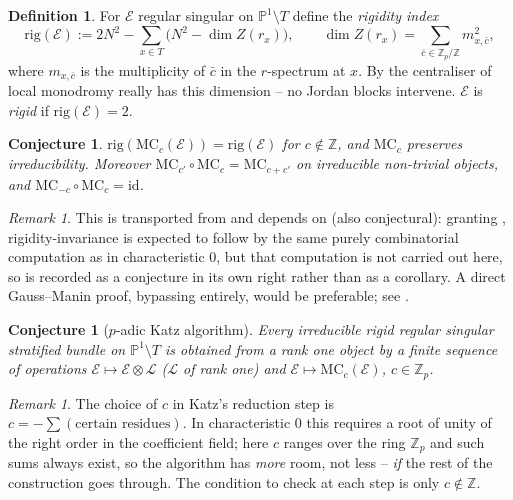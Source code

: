 \documentclass[11pt,reqno]{amsart}
\newcommand{\Zp}{\mathbb{Z}_p}
\newcommand{\ZZ}{\mathbb{Z}}
\newcommand{\PP}{\mathbb{P}}
\newcommand{\cE}{\mathcal{E}}
\newcommand{\cL}{\mathcal{L}}
\newcommand{\id}{\mathrm{id}}
\newcommand{\MC}{\mathrm{MC}}
\newcommand{\rig}{\mathrm{rig}}
\theoremstyle{plain}
\newtheorem{conjecture}[theorem]{Conjecture}
\theoremstyle{definition}
\newtheorem{definition}[theorem]{Definition}
\theoremstyle{remark}
\newtheorem{remark}[theorem]{Remark}
\numberwithin{equation}{section}
\begin{document}
\begin{definition}
For $\cE$ regular singular on $\PP^1\setminus T$ define the
\emph{rigidity index}
\[
   \rig(\cE):=2N^2-\sum_{x\in T}\bigl(N^2-\dim Z(r_x)\bigr),
   \qquad
   \dim Z(r_x)=\sum_{\bar c\in\Zp/\ZZ}m_{x,\bar c}^2 ,
\]
where $m_{x,\bar c}$ is the multiplicity of $\bar c$ in the $r$-spectrum
at $x$.  By  the centraliser of local monodromy
really has this dimension -- no Jordan blocks intervene.  $\cE$ is
\emph{rigid} if $\rig(\cE)=2$.
\end{definition}

\begin{conjecture}\label{prop:rigMC}
$\rig(\MC_c(\cE))=\rig(\cE)$ for $c\notin\ZZ$, and $\MC_c$ preserves
irreducibility.  Moreover $\MC_{c'}\circ\MC_c=\MC_{c+c'}$ on irreducible
non-trivial objects, and $\MC_{-c}\circ\MC_c=\id$.
\end{conjecture}

\begin{remark}
This is transported from \cite[6.0]{Katz2} and depends on
 (also conjectural): granting ,
rigidity-invariance is expected to follow by the same purely
combinatorial computation as in characteristic $0$, but that computation
is not carried out here, so  is recorded as a conjecture
in its own right rather than as a corollary.  A direct Gauss--Manin proof,
bypassing  entirely, would be preferable; see
.
\end{remark}

\begin{conjecture}[$p$-adic Katz algorithm]\label{conj:katzalg}
Every irreducible rigid regular singular stratified bundle on
$\PP^1\setminus T$ is obtained from a rank one object by a finite sequence
of operations $\cE\mapsto\cE\otimes\cL$ ($\cL$ of rank one) and
$\cE\mapsto\MC_c(\cE)$, $c\in\Zp$.
\end{conjecture}

\begin{remark}
The choice of $c$ in Katz's reduction step is $c=-\sum(\text{certain
residues})$.  In characteristic $0$ this requires a root of unity of the
right order in the coefficient field; here $c$ ranges over the ring $\Zp$
and such sums always exist, so the algorithm has \emph{more} room, not
less -- \emph{if} the rest of the construction goes through.  The
condition to check at each step is only $c\notin\ZZ$.
\end{remark}
\end{document}
